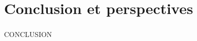 \documentclass[10pt]{beamer}
\begin{document}

\section{Conclusion et perspectives}

\begin{frame}
  \frametitle{}
  
  \huge{CONCLUSION}
  
\end{frame}
\end{document}
